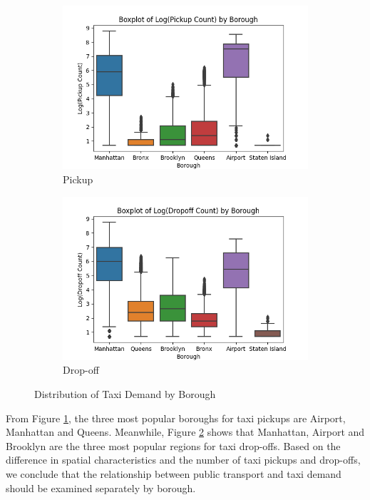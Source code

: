 \documentclass[11pt]{article}
\begin{document}
\begin{figure}[h]
    \begin{subfigure}{0.5\textwidth}
        \includegraphics[width=0.9\linewidth]{boxplot_log_pickup.png} 
        \caption{Pickup}
        \label{fig:boxplot1}
    \end{subfigure}
    \begin{subfigure}{0.5\textwidth}
        \includegraphics[width=0.9\linewidth]{boxplot_log_dropoff.png}
        \caption{Drop-off}
        \label{fig:boxplot2}
    \end{subfigure}
\caption{Distribution of Taxi Demand by Borough}
\label{fig:boxplot}
\end{figure}

From Figure \ref{fig:boxplot1}, the three most popular boroughs for taxi pickups are Airport, Manhattan and Queens. Meanwhile, Figure \ref{fig:boxplot2} shows that Manhattan, Airport and Brooklyn are the three most popular regions for taxi drop-offs. Based on the difference in spatial characteristics and the number of taxi pickups and drop-offs, we conclude that the relationship between public transport and taxi demand should be examined separately by borough. 
\end{document}

